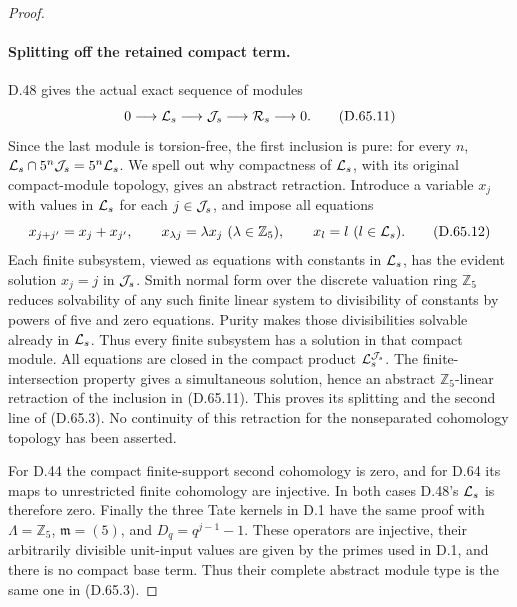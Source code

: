 \begin{proof}
\paragraph{Splitting off the retained compact term.}
D.48 gives the actual exact sequence of modules
\[
       0\longrightarrow{\cal L}_s
         \longrightarrow{\cal J}_s
         \longrightarrow{\cal R}_s\longrightarrow0.
                                                        \tag{D.65.11}
\]
Since the last module is torsion-free, the first
inclusion is pure: for every \(n\),
\({\cal L}_s\cap5^n{\cal J}_s=5^n{\cal L}_s\).
We spell out why compactness of \({\cal L}_s\), with
its original compact-module topology, gives an
abstract retraction. Introduce a variable \(x_j\)
with values in \({\cal L}_s\) for each
\(j\in{\cal J}_s\), and impose all equations
\[
 x_{j+j'}=x_j+x_{j'},\qquad
 x_{\lambda j}=\lambda x_j\ (\lambda\in\mathbb Z_5),
                 \qquad x_l=l\ (l\in{\cal L}_s).
                                                        \tag{D.65.12}
\]
Each finite subsystem, viewed as equations with
constants in \({\cal L}_s\), has the evident solution
\(x_j=j\) in \({\cal J}_s\). Smith normal form over
the discrete valuation ring \(\mathbb Z_5\) reduces
solvability of any such finite linear system to
divisibility of constants by powers of five and
zero equations. Purity makes those divisibilities
solvable already in \({\cal L}_s\). Thus every finite
subsystem has a solution in that compact module.
All equations are closed in the compact product
\({\cal L}_s^{{\cal J}_s}\). The finite-intersection
property gives a simultaneous solution, hence an
abstract \(\mathbb Z_5\)-linear retraction of the
inclusion in (D.65.11). This proves its splitting
and the second line of (D.65.3). No continuity of
this retraction for the nonseparated cohomology
topology has been asserted.

For D.44 the compact finite-support second cohomology
is zero, and for D.64 its maps to unrestricted finite
cohomology are injective. In both cases D.48's
\({\cal L}_s\) is therefore zero. Finally the three
Tate kernels in D.1 have the same proof with
\(\Lambda=\mathbb Z_5\), \(\mathfrak m=(5)\), and
\(D_q=q^{j-1}-1\). These operators are injective,
their arbitrarily divisible unit-input values are
given by the primes used in D.1, and there is no
compact base term. Thus their complete abstract
module type is the same one in (D.65.3).
\end{proof}
